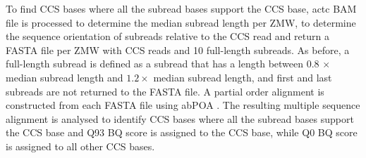 To find CCS bases where all the subread bases support the CCS base, actc BAM file is processed to determine the median subread length per ZMW, to determine the sequence orientation of subreads relative to the CCS read and return a FASTA file per ZMW with CCS reads and 10 full-length subreads. As before, a full-length subread is defined as a subread that has a length between 0.8 $\times$ median subread length and $1.2 \times$ median subread length, and first and last subreads are not returned to the FASTA file. A partial order alignment is constructed from each FASTA file using abPOA \cite{Gao2021-nf}. The resulting multiple sequence alignment is analysed to identify CCS bases where all the subread bases support the CCS base and Q93 BQ score is assigned to the CCS base, while Q0 BQ score is assigned to all other CCS bases. 



